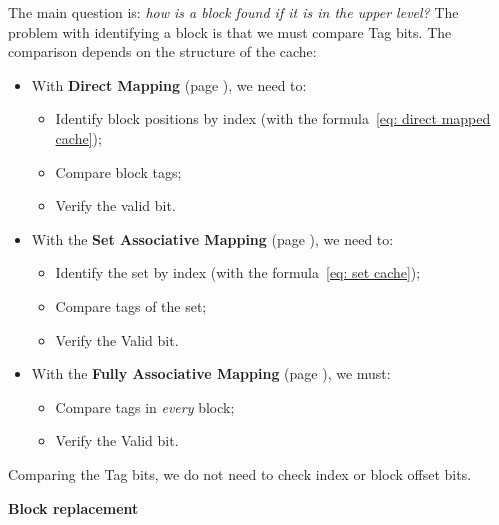 \noindent
The main question is: \emph{how is a block found if it is in the upper level?} The problem with identifying a block is that we must compare Tag bits. The comparison depends on the structure of the cache:
\begin{itemize}
    \item With \textbf{Direct Mapping} (page \pageref{Direct Mapped Cache}), we need to:
    \begin{itemize}
        \item Identify block positions by index (with the formula~\ref{eq: direct mapped cache});

        \item Compare block tags;
        
        \item Verify the valid bit.
    \end{itemize}

    \item With the \textbf{Set Associative Mapping} (page \pageref{n-way Set Associative Cache}), we need to:
    \begin{itemize}
        \item Identify the set by index (with the formula~\ref{eq: set cache});

        \item Compare tags of the set;

        \item Verify the Valid bit.
    \end{itemize}

    \item With the \textbf{Fully Associative Mapping} (page \pageref{Fully Associative Cache}), we must:
    \begin{itemize}
        \item Compare tags in \emph{every} block;
        
        \item Verify the Valid bit.
    \end{itemize}
\end{itemize}
Comparing the Tag bits, we do not need to check index or block offset bits.

\hfill

\longline

\hfill

\begin{center}
    \large
    \label{Block replacement}
    \hypertarget{Block replacement}{\textcolor{Red2}{\textbf{Block replacement}}}
\end{center}


